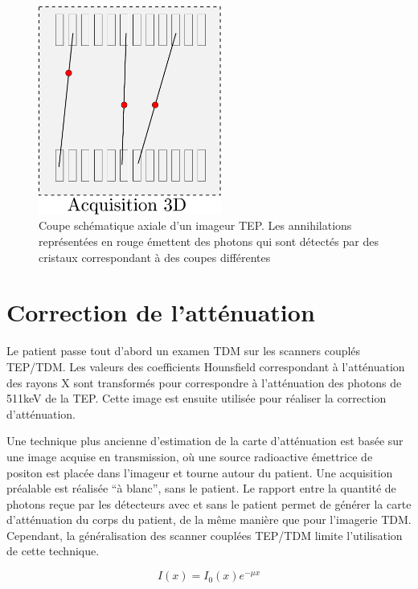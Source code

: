 \begin{figure}
\centering
\includegraphics[width=6cm]{images/2D3D}
\caption[Acquisitions 3D en TEP]{Coupe schématique axiale d'un imageur TEP. Les annihilations représentées en rouge émettent des photons qui sont détectés par des cristaux correspondant à des coupes différentes}
\label{fig:2D3D}
\end{figure}



	\section{Correction de l'atténuation}
\label{CorrectionAttenuation}

Le patient passe tout d'abord un examen TDM sur les scanners couplés TEP/TDM. Les valeurs des coefficients Hounsfield correspondant à l'atténuation des rayons X sont transformés pour correspondre à l'atténuation des photons de 511keV de la TEP. Cette image est ensuite utilisée pour réaliser la correction d'atténuation. 

Une technique plus ancienne d'estimation de la carte d'atténuation est basée sur une image acquise en transmission, où une source radioactive émettrice de positon est placée dans l'imageur et tourne autour du patient. Une acquisition  préalable est réalisée ``à blanc'', sans le patient. Le rapport entre la quantité de photons reçue par les détecteurs avec et sans le patient permet de générer la carte d'atténuation du corps du patient, de la même manière que pour l'imagerie TDM. Cependant, la généralisation des scanner couplées TEP/TDM limite l'utilisation de cette technique.

\begin{equation}
I(x) = I_0(x) e^{-\mu x}
\end{equation}

